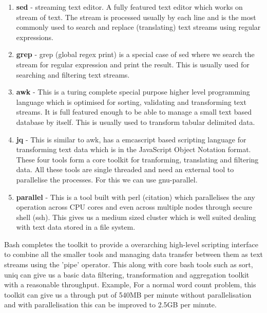 \begin{enumerate}

  \item \textbf{sed} - streaming text editor. A fully featured text editor which works on  stream of text. The stream is processed usually by each line and is the most  commonly used to search and replace (translating) text streams using regular  expressions.

  \item \textbf{grep} - grep (global regex print) is a special case of sed where we search  the stream for regular expression and print the result. This is usually used  for searching and filtering text streams.

  \item \textbf{awk} - This is a turing complete special purpose higher level programming  language which is optimised for sorting, validating and transforming text  streams. It is full featured enough to be able to manage a small text based  database by itself. This is usually used to transform tabular delimited data.

  \item \textbf{jq} - This is similar to awk, has a emcascript based scripting language  for transforming text data which is in the JavaScript Object Notation format. These four tools form a core toolkit for tranforming, translating and  filtering data. All these tools are single threaded and need an external tool  to parallelise the processes. For this we can use gnu-parallel.

  \item \textbf{parallel} - This is a tool built with perl (citation) which parallelises  the any operation across CPU cores and even across multiple nodes through  secure shell (ssh). This gives us a medium sized cluster which is well suited  dealing with text data stored in a file system.

\end{enumerate}

Bash completes the toolkit to provide a overarching high-level scripting interface to combine all the smaller tools and managing data transfer between them as text streams using the 'pipe' operator.
This along with core bash tools such as sort, uniq can give us a basic data filtering, transformation and aggregation toolkit with a reasonable throughput.
Example, For a normal word count problem, this toolkit can give us a through put of 540MB per minute without parallelisation and with parallelisation this can be improved to 2.5GB per minute.


